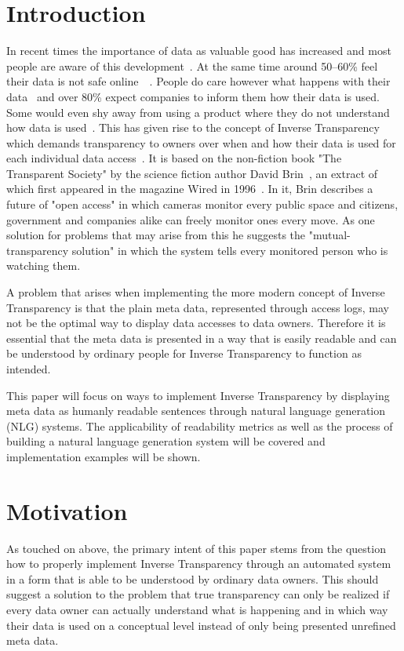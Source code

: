\documentclass[sigconf,obeyspaces]{acmart}
\begin{document}
\section{Introduction}
In recent times the importance of data as valuable good has increased and most people are aware of this development~\cite[10\psq]{symantec_State_of_Privacy}. At the same time around 50--60\% feel their data is not safe online~\cite[6\psq]{symantec_State_of_Privacy}~\cite[22\psq]{Bitkom_Datenschutz}. People do care however what happens with their data~\cite[24\psq]{Bitkom_Datenschutz} and over 80\% expect companies to inform them how their data is used. Some would even shy away from using a product where they do not understand how data is used~\cite{BVDW_Datenschutz}. This has given rise to the concept of Inverse Transparency which demands transparency to owners over when and how their data is used for each individual data access~\cite{gierlich_jonas}. It is based on the non-fiction book "The Transparent Society" by the science fiction author David Brin~\cite{Brin_1998}, an extract of which first appeared in the magazine Wired in 1996~\cite{Brin_1996}. In it, Brin describes a future of "open access" in which cameras monitor every public space and citizens, government and companies alike can freely monitor ones every move. As one solution for problems that may arise from this he suggests the "mutual-transparency solution" in which the system tells every monitored person who is watching them.

A problem that arises when implementing the more modern concept of Inverse Transparency is that the plain meta data, represented through access logs, may not be the optimal way to display data accesses to data owners. Therefore it is essential that the meta data is presented in a way that is easily readable and can be understood by ordinary people for Inverse Transparency to function as intended.

This paper will focus on ways to implement Inverse Transparency by displaying meta data as humanly readable sentences through natural language generation (NLG) systems. The applicability of readability metrics as well as the process of building a natural language generation system will be covered and implementation examples will be shown.

\section{Motivation}
As touched on above, the primary intent of this paper stems from the question how to properly implement Inverse Transparency through an automated system in a form that is able to be understood by ordinary data owners. This should suggest a solution to the problem that true transparency can only be realized if every data owner can actually understand what is happening and in which way their data is used on a conceptual level instead of only being presented unrefined meta data.
\end{document}
